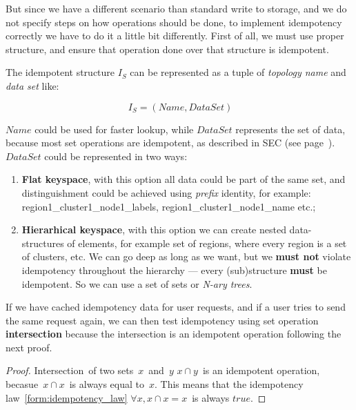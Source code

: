 But since we have a different scenario than standard write to storage, and we do not specify steps on how operations should be done, to implement idempotency correctly we have to do it a little bit differently. First of all, we must use proper structure, and ensure that operation done over that structure is idempotent.

The idempotent structure $I_S$ can be represented as a tuple of \emph{topology name} and \emph{data set} like: 

\begin{equation}~\label{idem:eq1}
	I_S=(Name, DataSet)
\end{equation}

\noindent
$Name$ could be used for faster lookup, while $DataSet$ represents the set of data, because most set operations are idempotent, as described in SEC (see page~\pageref{sec}). $DataSet$ could be represented in two ways:

\begin{enumerate}[start=1,label={(\bfseries \arabic*)}]
	\item \textbf{Flat keyspace}, with this option all data could be part of the same set, and distinguishment could be achieved using \textit{prefix} identity, for example: region1\_cluster1\_node1\_labels, region1\_cluster1\_node1\_name etc.;
	\item \textbf{Hierarhical keyspace}, with this option we can create nested data-structures of elements, for example set of regions, where every region is a set of clusters, etc. We can go deep as long as we want, but we \textbf{must not} violate idempotency throughout the hierarchy --- every (sub)structure \textbf{must} be idempotent. So we can use a set of sets or \emph{N-ary trees}.
\end{enumerate}%

\noindent
If we have cached idempotency data for user requests, and if a user tries to send the same request again, we can then test idempotency using set operation \textbf{intersection} because the intersection is an idempotent operation following the next proof.

\begin{proof}\label{def:intersection_idempotent}
	Intersection of two sets $x$ and $y$ $x \cap y$ is an idempotent operation, becasue $x \cap x$ is always equal to $x$. This means that the idempotency law~\ref{form:idempotency_law} $\forall x, x \cap x = x$ is always $true$.
\end{proof}

